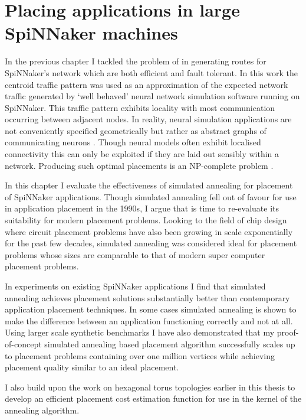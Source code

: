 \chapter{Placing applications in large SpiNNaker machines}
	
	\label{sec:placement}
	
	In the previous chapter I tackled the problem of in generating routes for
	SpiNNaker's network which are both efficient and fault tolerant.  In this
	work the centroid traffic pattern was used as an approximation of the
	expected network traffic generated by `well behaved' neural network
	simulation software running on SpiNNaker. This traffic pattern exhibits
	locality with most communication occurring between adjacent nodes.  In
	reality, neural simulation applications are not conveniently specified
	geometrically but rather as abstract graphs of communicating neurons
	\cite{davison08,eliasmith13}. Though neural models often exhibit localised
	connectivity this can only be exploited if they are laid out sensibly within
	a network. Producing such optimal placements is an NP-complete problem
	\cite{hoefler11}.
	
	In this chapter I evaluate the effectiveness of simulated annealing for
	placement of SpiNNaker applications. Though simulated annealing fell out of
	favour for use in application placement in the 1990s, I argue that is time to
	re-evaluate its suitability for modern placement problems. Looking to the
	field of chip design where circuit placement problems have also been growing
	in scale exponentially for the past few decades, simulated annealing was
	considered ideal for placement problems whose sizes are comparable to that of
	modern super computer placement problems.
	
	In experiments on existing SpiNNaker applications I find that simulated
	annealing achieves placement solutions substantially better than contemporary
	application placement techniques. In some cases simulated annealing is shown
	to make the difference between an application functioning correctly and not
	at all. Using larger scale synthetic benchmarks I have also demonstrated that
	my proof-of-concept simulated annealing based placement algorithm
	successfully scales up to placement problems containing over one million
	vertices while achieving placement quality similar to an ideal placement.
	
	I also build upon the work on hexagonal torus topologies earlier in this
	thesis to develop an efficient placement cost estimation function for use in
	the kernel of the annealing algorithm.
	
